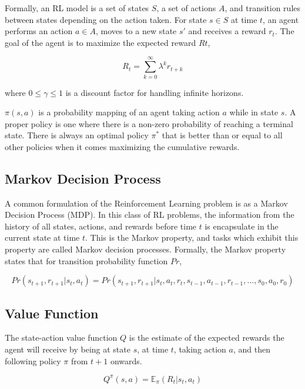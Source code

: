 \documentclass[11pt, oneside]{article}   	%
\begin{document}
\hfill

Formally, an RL model is a set of states $S$, a set of actions $A$, and transition rules between states depending on the action taken. For state $s \in S$ at time $t$, an agent performs an action $a \in A$, moves to a new state $s'$ and receives a reward $r_t$. The goal of the agent is to maximize the expected reward $Rt$,

\begin{equation}
R_t = \sum_{k=0}^{\infty}\lambda^kr_{t+k}
\end{equation}

where $0 \leq \gamma \leq 1$ is a discount factor for handling infinite horizons.

\hfill

$\pi(s,a)$ is a probability mapping of an agent taking action $a$ while in state $s$. A proper policy is one where there is a non-zero probability of reaching a terminal state. There is always an optimal policy $\pi^*$ that is better than or equal to all other policies when it comes maximizing the cumulative rewards. 

\subsection{Markov Decision Process}

A common formulation of the Reinforcement Learning problem is as a Markov Decision Process (MDP). In this class of RL problems, the information from the history of all states, actions, and rewards before time $t$ is encapsulate in the current state at time $t$. This is the Markov property, and tasks which exhibit this property are called Markov decision processes. Formally, the Markov property states that for transition probability function $Pr$,

\begin{equation}
Pr(s_{t+1}, r_{t+1} | s_t, a_t) = Pr(s_{t+1}, r_{t+1} | s_t,a_t, r_t, s_{t-1}, a_{t-1}, r_{t-1},...,s_0, a_0, r_0)
\end{equation}

\subsection{Value Function}
The state-action value function $Q$ is the estimate of the expected rewards the agent will receive by being at state $s$, at time $t$, taking action $a$, and then following policy $\pi$ from $t+1$ onwards. 

\begin{equation}
Q^\pi(s,a) = \mathbb{E}_\pi(R_t | s_t, a_t)
\end{equation}
\end{document}
